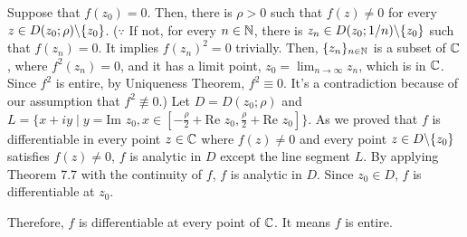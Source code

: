 Suppose that \(f(z_0) = 0\).
Then, there is \(\rho > 0\) such that \(f(z) \neq 0\) for every \(z \in D(z_0; \rho) \bs \{z_0\}\).
(\(\because\)
 If not, for every \(n \in \mathbb{N}\), there is \(z_n \in D(z_0; 1/n) \bs \{z_0\}\)
 such that \(f(z_n) = 0\).
 It implies \(f(z_n)^2 = 0\) trivially.
 Then, \(\{z_n\}_{n \in \mathbb{N}}\) is a subset of \(\mathbb{C}\), where \(f^2(z_n) = 0\), and it has a limit point, \(z_0 = \lim_{n \to \infty} z_n\), which is in \(\mathbb{C}\).
 Since \(f^2\) is entire, by Uniqueness Theorem, \(f^2 \equiv 0\).
 It's a contradiction because of our assumption that \(f^2 \not\equiv 0\).)
Let \(D = D(z_0; \rho)\) and \(L = \{x + iy \mid y = \text{Im } z_0, x \in [-\frac{\rho}{2} + \text{Re } z_0, \frac{\rho}{2} + \text{Re } z_0]\}\).
As we proved that \(f\) is differentiable in every point \(z \in \mathbb{C}\) where \(f(z) \neq 0\) and every point \(z \in D \bs \{z_0\}\) satisfies \(f(z) \neq 0\),
\(f\) is analytic in \(D\) except the line segment \(L\).
By applying Theorem 7.7 with the continuity of \(f\), \(f\) is analytic in \(D\).
Since \(z_0 \in D\), \(f\) is differentiable at \(z_0\).

Therefore, \(f\) is differentiable at every point of \(\mathbb{C}\). It means \(f\) is entire.
\qedsq
